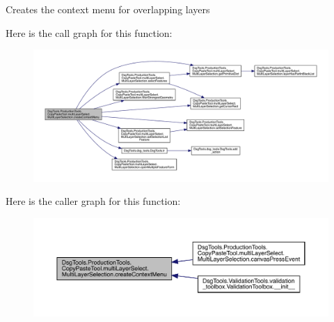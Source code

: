 \begin{DoxyVerb}Creates the context menu for overlapping layers
\end{DoxyVerb}
 Here is the call graph for this function\+:
\nopagebreak
\begin{figure}[H]
\begin{center}
\leavevmode
\includegraphics[width=350pt]{class_dsg_tools_1_1_production_tools_1_1_copy_paste_tool_1_1multi_layer_select_1_1_multi_layer_selection_aef32a3f7fc1278b8cc1716c608781d69_cgraph}
\end{center}
\end{figure}
Here is the caller graph for this function\+:
\nopagebreak
\begin{figure}[H]
\begin{center}
\leavevmode
\includegraphics[width=350pt]{class_dsg_tools_1_1_production_tools_1_1_copy_paste_tool_1_1multi_layer_select_1_1_multi_layer_selection_aef32a3f7fc1278b8cc1716c608781d69_icgraph}
\end{center}
\end{figure}
\mbox{\label{class_dsg_tools_1_1_production_tools_1_1_copy_paste_tool_1_1multi_layer_select_1_1_multi_layer_selection_a51e315b9dd7609f9a5d277377071098b}} 
